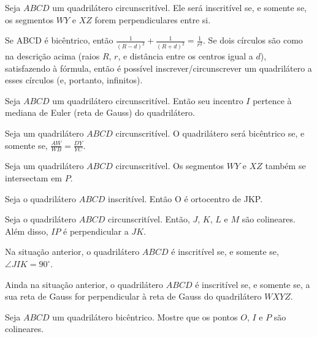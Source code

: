 \documentclass[10pt, a4paper]{article}
\begin{document}
	\begin{prob}
		Seja $ABCD$ um quadrilátero circunscritível. Ele será inscritível se, e somente se, os segmentos $WY$ e $XZ$ forem perpendiculares entre si.
	\end{prob}
	\begin{prob}
		Se ABCD é bicêntrico, então $\frac{1}{(R-d)^2} + \frac{1}{(R+d)^2} = \frac{1}{r^2}$. Se dois círculos são como na descrição acima (raios $R$, $r$, e distância entre os centros igual a $d$), satisfazendo à fórmula, então é possível inscrever/circunscrever um quadrilátero a esses círculos (e, portanto, infinitos).
	\end{prob}
	\begin{prob}
		Seja $ABCD$ um quadrilátero circunscritível. Então seu incentro $I$ pertence à mediana de Euler (reta de Gauss) do quadrilátero.
	\end{prob}
	\begin{prob}
		Seja um quadrilátero $ABCD$ circunscritível. O quadrilátero será bicêntrico se, e somente se, $\frac{AW}{WB} = \frac{DY}{YC}$.
	\end{prob}
	\begin{prob}
		Seja um quadrilátero $ABCD$ circunscritível. Os segmentos $WY$ e $XZ$ também se intersectam em $P$.
	\end{prob}
	\begin{prob}
		Seja o quadrilátero $ABCD$ inscritível. Então O é ortocentro de JKP.
	\end{prob}
	\begin{prob}
		Seja o quadrilátero $ABCD$ circunscritível. Então, $J$, $K$, $L$ e $M$ são colineares. Além disso, $IP$ é perpendicular a $JK$.
	\end{prob}
	\begin{prob}
		Na situação anterior, o quadrilátero $ABCD$ é inscritível se, e somente se, $\angle JIK = 90^\circ$.
	\end{prob}
	\begin{prob}
		Ainda na situação anterior, o quadrilátero $ABCD$ é inscritível se, e somente se, a sua reta de Gauss for perpendicular à reta de Gauss do quadrilátero $WXYZ$.
	\end{prob}
	\begin{prob}
		Seja $ABCD$ um quadrilátero bicêntrico. Mostre que os pontos $O$, $I$ e $P$ são colineares. 
	\end{prob}
\end{document}
